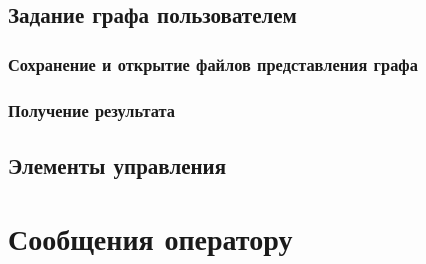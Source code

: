 \documentclass[a4paper,12pt]{article}
\begin{document}
	\subsection{Задание графа пользователем}
	\subsubsection{Сохранение и открытие файлов представления графа}
	\subsubsection{Получение результата}
	\subsection{Элементы управления}
	
						\newpage
	\section{Сообщения оператору}

						\newpage
	\listRegistration
\end{document}
